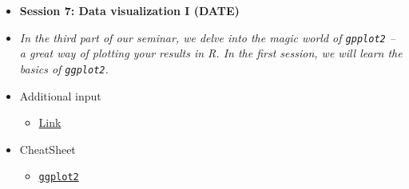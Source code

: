 \documentclass{article}
\begin{document}
\begin{itemize}
\item[] \textbf{Session 7: Data visualization I (DATE)} 
\item[]\textit{In the third part of our seminar, we delve into the magic world of \texttt{gpplot2} -- a great way of plotting your results in \textsf{R}. In the first session, we will learn the basics of \texttt{ggplot2}.}
{\color{darkgray}}
\item[] \faEdit \space Additional input
\begin{itemize} 
\item[$\square$] \href{url}{Link}
\end{itemize}
\item[] \faLightbulbO \space CheatSheet
\begin{itemize} 
\item[$\square$] \href{https://www.rstudio.com/wp-content/uploads/2015/03/ggplot2-cheatsheet.pdf}{\texttt{ggplot2}}
\end{itemize}


\end{itemize}
\end{document}

